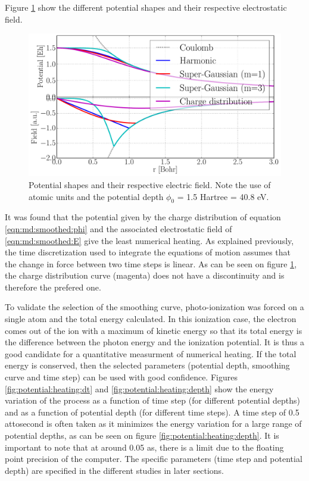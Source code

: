 Figure \ref{fig:potential:shapes} show the different potential shapes and their
respective electrostatic field.

\begin{figure}
 \centering
 \includegraphics[width=\figurewidth]{figures/potential_shapes}
 \caption{\label{fig:potential:shapes}Potential shapes and their respective
          electric field. Note the use of atomic units and the potential depth
          $\phi_0$ = 1.5 Hartree = 40.8 eV.}
\end{figure}

It was found that the potential given by the charge distribution of equation
\eqref{eqn:md:smoothed:phi} and the associated electrostatic field of
\eqref{eqn:md:smoothed:E} give the
least numerical heating. As explained
previously, the time discretization used to integrate the equations of motion
assumes that the change in force between two time steps is linear. As can be
seen on figure \ref{fig:potential:shapes}, the charge distribution curve
(magenta) does not have a discontinuity and is therefore the prefered one.

To validate the selection of the smoothing curve, photo-ionization was forced
on a single atom and the total energy calculated. In this ionization case, the
electron comes out of the ion with a maximum of kinetic energy so that
its total energy is the difference between the photon energy and the ionization
potential. It is thus a
good candidate %
for a quantitative measurment of numerical heating.
If the total
energy is conserved, then the selected parameters (potential depth, smoothing
curve and time step) can be used with good confidence. Figures
\ref{fig:potential:heating:dt} and \ref{fig:potential:heating:depth} show the
energy variation of the process as a function of time step (for different
potential %
depths) and as a function of potential depth (for different time
steps).
A time step of 0.5 attosecond is often taken as
it minimizes the energy variation for a large
range of potential depths, as can be seen on figure
\ref{fig:potential:heating:depth}.
%
%
It is important to note that at around 0.05 as, there is a
limit due to the floating point precision of the computer. The specific
parameters (time step and potential depth) are specified in the different
studies in later sections.

